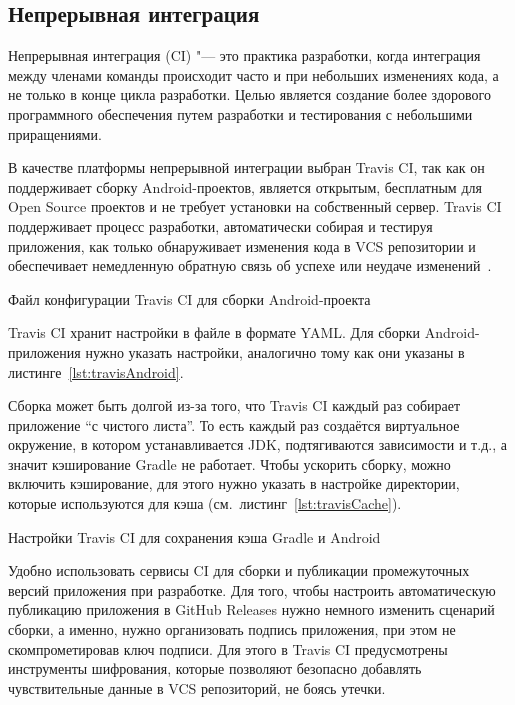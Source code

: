 \subsection{Непрерывная интеграция}
\label{subsec:ci}

Непрерывная интеграция (CI) "--- это практика разработки, когда интеграция между членами команды происходит часто и при небольших изменениях кода, а не только в конце цикла разработки.
Целью является создание более здорового программного обеспечения путем разработки и тестирования с небольшими приращениями.

В качестве платформы непрерывной интеграции выбран Travis CI, так как он поддерживает сборку Android-проектов, является открытым, бесплатным для Open Source проектов и не требует установки на собственный сервер.
Travis CI поддерживает процесс разработки, автоматически собирая и тестируя приложения, как только обнаруживает изменения кода в VCS репозитории и обеспечивает немедленную обратную связь об успехе или неудаче изменений~\cite{travis:docs}.

\begin{listing}[H]
  \caption{Файл конфигурации Travis CI для сборки Android-проекта}
  \label{lst:travisAndroid}
\end{listing}

Travis CI хранит настройки в файле  в формате YAML\@.
Для сборки Android-приложения нужно указать настройки, аналогично тому как они указаны в листинге~\ref{lst:travisAndroid}.

Сборка может быть долгой из-за того, что Travis CI каждый раз собирает приложение ``с чистого листа''.
То есть каждый раз создаётся виртуальное окружение, в котором устанавливается JDK, подтягиваются зависимости и т.д., а значит кэширование Gradle не работает.
Чтобы ускорить сборку, можно включить кэширование, для этого нужно указать в настройке  директории, которые используются для кэша (см.~листинг~\ref{lst:travisCache}).

\begin{listing}[h]
  \caption{Настройки Travis CI для сохранения кэша Gradle и Android}
  \label{lst:travisCache}
\end{listing}

Удобно использовать сервисы CI для сборки и публикации промежуточных версий приложения при разработке.
Для того, чтобы настроить автоматическую публикацию приложения в GitHub Releases нужно немного изменить сценарий сборки, а именно, нужно организовать подпись приложения, при этом не скомпрометировав ключ подписи.
Для этого в Travis CI предусмотрены инструменты шифрования, которые позволяют безопасно добавлять чувствительные данные в VCS репозиторий, не боясь утечки.

